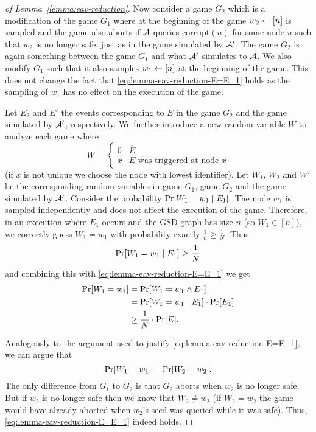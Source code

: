 \begin{proof}[of Lemma~\ref{lemma:eav-reduction}]
	Now consider a game $G_2$ which is a modification of the game $G_1$ where at the beginning of the game $w_2 \leftarrow [n]$ is sampled and the game also aborts if $\mathcal{A}$ queries $\mathrm{corrupt}(u)$ for some node $u$ such that $w_2$ is no longer safe, just as in the game simulated by $\mathcal{A}'$. The game $G_2$ is again something between the game $G_1$ and what $\mathcal{A}'$ simulates to $\mathcal{A}$. We also modify $G_1$ such that it also samples $w_1 \leftarrow [n]$ at the beginning of the game. This does not change the fact that \eqref{eq:lemma-eav-reduction-E=E_1} holds as the sampling of $w_1$ has no effect on the execution of the game.

	Let $E_2$ and $E'$ the events corresponding to $E$ in the game $G_2$ and the game simulated by $\mathcal{A}'$, respectively. We further introduce a new random variable $W$ to analyze each game where
	\[
		W = \begin{cases}
			0 & \overline{E}                       \\
			x & E \text{ was triggered at node } x
		\end{cases}
	\]
	(if $x$ is not unique we choose the node with lowest identifier).
	Let $W_1$, $W_2$ and $W'$ be the corresponding random variables in game $G_1$, game $G_2$ and the game simulated by $\mathcal{A}'$. Consider the probability $\pr{W_1 = w_1 \mid E_1}$. The node $w_1$ is sampled independently and does not affect the execution of the game. Therefore, in an execution where $E_1$ occurs and the GSD graph has size $n$ (so $W_1 \in [n]$), we correctly guess $W_1 = w_1$ with probability exactly $\frac{1}{n} \ge \frac{1}{N}$. Thus
	\[
		\pr{W_1 = w_1 \mid E_1} \ge \frac{1}{N}
	\]
	and combining this with \eqref{eq:lemma-eav-reduction-E=E_1} we get
	\begin{align} \label{eq:lemma-eav-reduction-detect-E1-G1}
		\begin{split}
			\pr{W_1 = w_1} & = \pr{W_1 = w_1 \land E_1} \\
			& = \pr{W_1 = w_1 \mid E_1} \cdot \pr{E_1} \\
			& \ge \frac{1}{N} \cdot \pr{E}.
		\end{split}
	\end{align}

	Analogously to the argument used to justify \eqref{eq:lemma-eav-reduction-E=E_1}, we can argue that
	\begin{equation} \label{eq:lemma-eav-reduction-G1-vs-G2}
		\pr{W_1 = w_1} = \pr{W_2 = w_2}.
	\end{equation}
	The only difference from $G_1$ to $G_2$ is that $G_2$ aborts when $w_2$ is no longer safe. But if $w_2$ is no longer safe then we know that $W_2 \neq w_2$ (if $W_2 = w_2$ the game would have already aborted when $w_2$'s seed was queried while it was safe). Thus, \eqref{eq:lemma-eav-reduction-E=E_1} indeed holds.


\end{proof}

